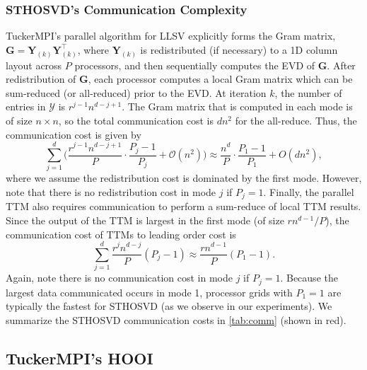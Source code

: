     \subsubsection{STHOSVD's Communication Complexity} \label{sec:STHOSVD's Communication Complexity}

        TuckerMPI's parallel algorithm for LLSV explicitly forms the Gram
        matrix, $\mathbf{G} = \mathbf{Y}_{(k)}\mathbf{Y}_{(k)}^\intercal$,
        where $\mathbf{Y}_{(k)}$ is redistributed (if necessary) to a 1D column
        layout across $P$ processors, and then sequentially computes the EVD of
        $\mathbf{G}$. After redistribution of $\mathbf{G}$, each processor
        computes a local Gram matrix which can be sum-reduced (or all-reduced)
        prior to the EVD. At iteration $k$, the number of entries in
        $\mathcal{Y}$ is $r^{j-1}n^{d-j+1}$. The Gram matrix that is computed in
        each mode is of size $n \times n$, so the total communication cost is
        $dn^2$ for the all-reduce. Thus, the communication cost is given by
        \begin{equation*}
            \sum_{j=1}^{d} \bigg(\frac{r^{j-1}n^{d-j+1}}{P}\cdot \frac{P_j - 1}{P_j} + \mathcal{O}(n^2)\bigg) \approx \frac{n^{d}}{P}\cdot \frac{P_1 - 1}{P_1} + O(dn^2),
        \end{equation*}
        where we assume the redistribution cost is dominated by the first mode. However,
        note that there is no redistribution cost in mode $j$ if $P_j=1$. Finally, the
        parallel TTM also requires communication to perform a sum-reduce of local TTM
        results. Since the output of the TTM is largest in the first mode (of size
        $rn^{d-1}/P$), the communication cost of TTMs to leading order cost is
        \begin{equation*}
            \sum_{j=1}^{d} \frac{r^{j}n^{d-j}}{P}(P_j - 1) \approx \frac{rn^{d-1}}{P}(P_1 - 1).
        \end{equation*}
        Again, note there is no communication cost in mode $j$ if $P_j=1$.
        Because the largest data communicated occurs in mode 1, processor grids
        with $P_1=1$ are typically the fastest for STHOSVD (as we observe in our
        experiments). We summarize the STHOSVD communication costs in
        \cref{tab:comm} (shown in red).

\subsection{TuckerMPI's HOOI} \label{sec:TuckerMPI's HOOI}
